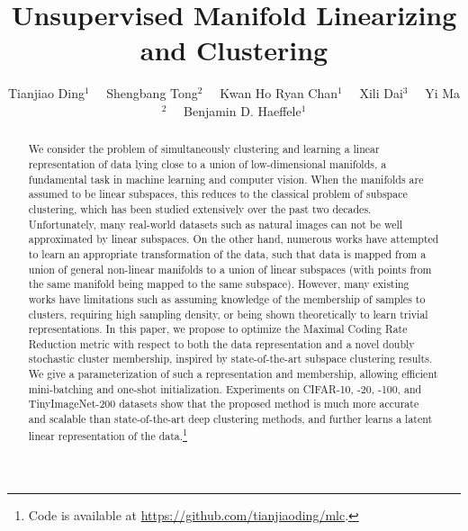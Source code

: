 \documentclass[10pt,twocolumn,letterpaper]{article}
\begin{document}
\title{Unsupervised Manifold Linearizing and Clustering}

\author{\normalsize Tianjiao Ding$^1$ \ \ Shengbang Tong$^2$ \ \ Kwan Ho Ryan Chan$^1$ \ \ Xili Dai$^3$ \ \ Yi Ma$^2$ \ \ Benjamin D. Haeffele$^1$}


\maketitle
{}
\setcounter{footnote}{3}

\ificcvfinal\thispagestyle{empty}\fi


\begin{abstract}
We consider the problem of simultaneously clustering and learning a linear representation of data lying close to a union of low-dimensional manifolds, a fundamental task in machine learning and computer vision. When the manifolds are assumed to be linear subspaces, this reduces to the classical problem of subspace clustering, which has been studied extensively over the past two decades. Unfortunately, many real-world datasets such as natural images can not be well approximated by linear subspaces. On the other hand, numerous works have attempted to learn an appropriate transformation of the data, such that data is mapped from a union of general non-linear manifolds to a union of linear subspaces (with points from the same manifold being mapped to the same subspace). However, many existing works have limitations such as assuming knowledge of the membership of samples to clusters, requiring high sampling density, or being shown theoretically to learn trivial representations. In this paper, we propose to optimize the Maximal Coding Rate Reduction metric with respect to both the data representation and a novel doubly stochastic cluster membership, inspired by state-of-the-art subspace clustering results. We give a parameterization of such a representation and membership, allowing efficient mini-batching and one-shot initialization. Experiments on CIFAR-10, -20, -100, and TinyImageNet-200 datasets show that the proposed method is much more accurate and scalable than state-of-the-art deep clustering methods, and further learns a latent linear representation of the data.\footnote{Code is available at {\scriptsize\url{https://github.com/tianjiaoding/mlc}}.}



   
   \end{abstract}
   
\end{document}
